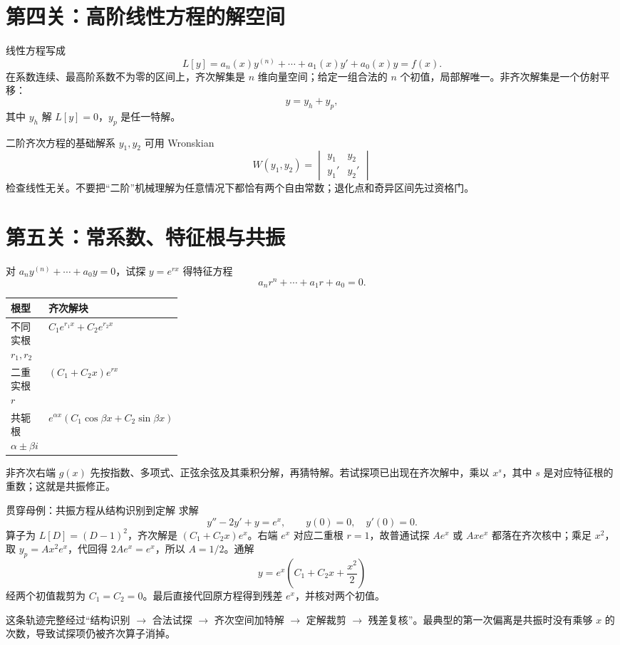 \documentclass[11pt,a4paper,fontset=fandol]{ctexart}
\begin{document}
\section{第四关：高阶线性方程的解空间}
线性方程写成
\[
L[y]=a_n(x)y^{(n)}+\cdots+a_1(x)y'+a_0(x)y=f(x).
\]
在系数连续、最高阶系数不为零的区间上，齐次解集是 $n$ 维向量空间；给定一组合法的 $n$ 个初值，局部解唯一。非齐次解集是一个仿射平移：
\[
\boxed{y=y_h+y_p},
\]
其中 $y_h$ 解 $L[y]=0$，$y_p$ 是任一特解。

二阶齐次方程的基础解系 $y_1,y_2$ 可用 Wronskian
\[
W(y_1,y_2)=\begin{vmatrix}y_1&y_2\\y_1'&y_2'\end{vmatrix}
\]
检查线性无关。不要把“二阶”机械理解为任意情况下都恰有两个自由常数；退化点和奇异区间先过资格门。

\section{第五关：常系数、特征根与共振}
对 $a_ny^{(n)}+\cdots+a_0y=0$，试探 $y=e^{rx}$ 得特征方程
\[
a_nr^n+\cdots+a_1r+a_0=0.
\]
\begin{tabularx}{\linewidth}{L{0.28\linewidth}Y}
\toprule
根型 & 齐次解块 \\
\midrule
不同实根 $r_1,r_2$ & $C_1e^{r_1x}+C_2e^{r_2x}$ \\
二重实根 $r$ & $(C_1+C_2x)e^{rx}$ \\
共轭根 $\alpha\pm\beta i$ & $e^{\alpha x}(C_1\cos\beta x+C_2\sin\beta x)$ \\
\bottomrule
\end{tabularx}

非齐次右端 $g(x)$ 先按指数、多项式、正弦余弦及其乘积分解，再猜特解。若试探项已出现在齐次解中，乘以 $x^s$，其中 $s$ 是对应特征根的重数；这就是共振修正。

\begin{examplebox}{贯穿母例：共振方程从结构识别到定解}
求解
\[
y''-2y'+y=e^x,\qquad y(0)=0,\quad y'(0)=0.
\]
算子为 $L[D]=(D-1)^2$，齐次解是 $(C_1+C_2x)e^x$。右端 $e^x$ 对应二重根 $r=1$，故普通试探 $Ae^x$ 或 $Axe^x$ 都落在齐次核中；乘足 $x^2$，取 $y_p=Ax^2e^x$，代回得 $2Ae^x=e^x$，所以 $A=1/2$。通解
\[
y=e^x\left(C_1+C_2x+\frac{x^2}{2}\right)
\]
经两个初值裁剪为 $C_1=C_2=0$。最后直接代回原方程得到残差 $e^x$，并核对两个初值。

这条轨迹完整经过“结构识别 $\to$ 合法试探 $\to$ 齐次空间加特解 $\to$ 定解裁剪 $\to$ 残差复核”。最典型的第一次偏离是共振时没有乘够 $x$ 的次数，导致试探项仍被齐次算子消掉。
\end{examplebox}
\end{document}
